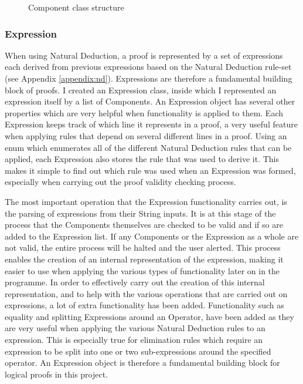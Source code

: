 \begin{figure}[!ht]
	\centering
	\caption{Component class structure}
\end{figure}

\subsubsection{Expression}

When using Natural Deduction, a proof is represented by a set of expressions each derived from previous expressions based on the Natural Deduction rule-set (see Appendix \ref{appendix:nd}). Expressions are therefore a fundamental building block of proofs. I created an Expression class, inside which I represented an expression itself by a list of Components. An Expression object has several other properties which are very helpful when functionality is applied to them. Each Expression keeps track of which line it represents in a proof, a very useful feature when applying rules that depend on several different lines in a proof. Using an enum which enumerates all of the different Natural Deduction rules that can be applied, each Expression also stores the rule that was used to derive it. This makes it simple to find out which rule was used when an Expression was formed, especially when carrying out the proof validity checking process.

The most important operation that the Expression functionality carries out, is the parsing of expressions from their String inputs. It is at this stage of the process that the Components themselves are checked to be valid and if so are added to the Expression list. If any Components or the Expression as a whole are not valid, the entire process will be halted and the user alerted. This process enables the creation of an internal representation of the expression, making it easier to use when applying the various types of functionality later on in the programme. In order to effectively carry out the creation of this internal representation, and to help with the various operations that are carried out on expressions, a lot of extra functionality has been added. Functionality such as equality and splitting Expressions around an Operator, have been added as they are very useful when applying the various Natural Deduction rules to an expression. This is especially true for elimination rules which require an expression to be split into one or two sub-expressions around the specified operator. An Expression object is therefore a fundamental building block for logical proofs in this project.

